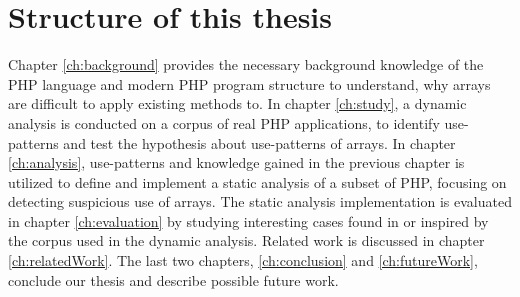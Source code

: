 \section{Structure of this thesis}
Chapter \ref{ch:background} provides the necessary background knowledge of the PHP language and modern PHP program structure to understand, why arrays are difficult to apply existing methods to. In chapter \ref{ch:study}, a dynamic analysis is conducted on a corpus of real PHP applications, to identify use-patterns and test the hypothesis about use-patterns of arrays. In chapter \ref{ch:analysis}, use-patterns and knowledge gained in the previous chapter is utilized to define and implement a static analysis of a subset of PHP, focusing on detecting suspicious use of arrays. The static analysis implementation is evaluated in chapter \ref{ch:evaluation} by studying interesting cases found in or inspired by the corpus used in the dynamic analysis. Related work is discussed in chapter \ref{ch:relatedWork}. The last two chapters, \ref{ch:conclusion} and \ref{ch:futureWork}, conclude our thesis and describe possible future work.
